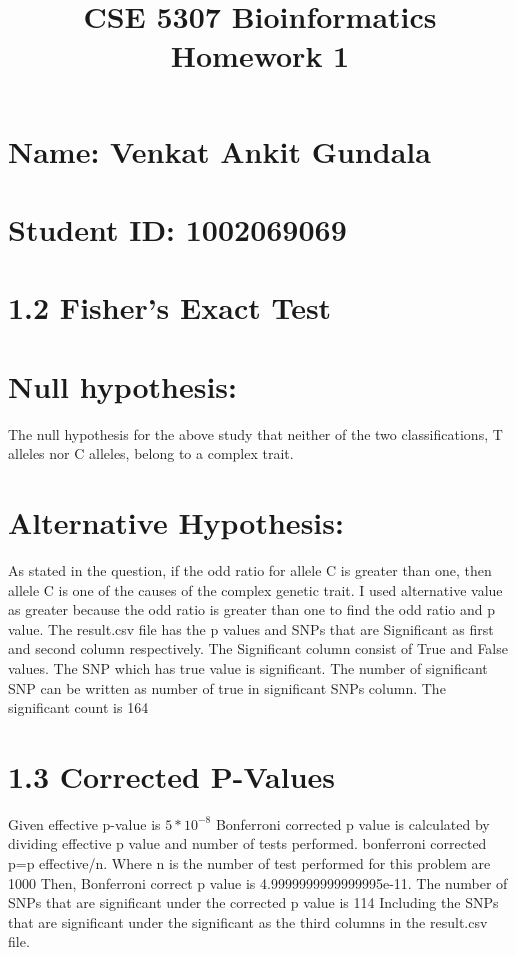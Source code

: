 \documentclass{article}
\title{\textbf{CSE 5307 Bioinformatics Homework 1}}
\date{}
\begin{document}
\maketitle
\section*{Name: Venkat Ankit Gundala}
\section*{Student ID: 1002069069}\bigskip


\section*{1.2 Fisher’s Exact Test}

\section*{\large Null hypothesis:}
{\large The null hypothesis for the above study that neither of the two classifications, T alleles nor C alleles, belong to a complex trait.}

\section*{\large Alternative Hypothesis:}
{\large As stated in the question, if the odd ratio for allele C is greater than one, then allele C is one of the causes of the complex genetic trait. I used alternative value as greater because the odd ratio is greater than one to find the odd ratio and p value.
\newline The result.csv file has the p values and SNPs that are Significant as first and second column respectively. The Significant column consist of True and False values. The SNP which has true value is significant.
\newline The number of significant SNP can be written as number of true in significant SNPs column.
\newline The significant count is 164}

\section*{1.3 Corrected P-Values}
{\large Given effective p-value is \begin{math}5*10^{-8}\end{math} Bonferroni corrected p value is calculated by dividing effective p value and number of tests performed.
\newline bonferroni corrected p=p effective/n.
\newline Where n is the number of test performed for this problem are 1000
Then, Bonferroni correct p value is 4.9999999999999995e-11.
\newline The number of SNPs that are significant under the corrected p value is 114
Including the SNPs that are significant under the significant as the third columns in the result.csv file.}
\end{document}
